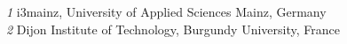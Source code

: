 \textit{1}  i3mainz, University of Applied Sciences Mainz, Germany    \\                                                                    
\textit{2}  Dijon Institute of Technology, Burgundy University, France